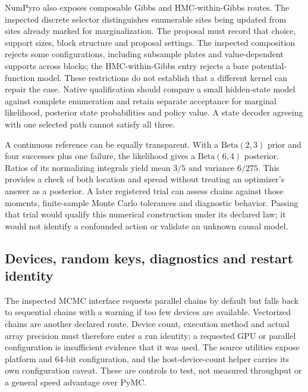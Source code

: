 NumPyro also exposes composable Gibbs and HMC-within-Gibbs routes. The inspected discrete selector distinguishes enumerable sites being updated from sites already marked for marginalization. The proposal must record that choice, support sizes, block structure and proposal settings. The inspected composition rejects some configurations, including subsample plates and value-dependent supports across blocks; the HMC-within-Gibbs entry rejects a bare potential-function model. These restrictions do not establish that a different kernel can repair the case. Native qualification should compare a small hidden-state model against complete enumeration and retain separate acceptance for marginal likelihood, posterior state probabilities and policy value. A state decoder agreeing with one selected path cannot satisfy all three. \cite{exec23_numpyro_sources}

A continuous reference can be equally transparent. With a $\mathrm{Beta}(2,3)$ prior and four successes plus one failure, the likelihood gives a $\mathrm{Beta}(6,4)$ posterior. Ratios of its normalizing integrals yield mean $3/5$ and variance $6/275$. This provides a check of both location and spread without treating an optimizer's answer as a posterior. A later registered trial can assess chains against those moments, finite-sample Monte Carlo tolerances and diagnostic behavior. Passing that trial would qualify this numerical construction under its declared law; it would not identify a confounded action or validate an unknown causal model. \cite{exec23_numpyro_reference}

\subsection{Devices, random keys, diagnostics and restart identity}

The inspected MCMC interface requests parallel chains by default but falls back to sequential chains with a warning if too few devices are available. Vectorized chains are another declared route. Device count, execution method and actual array precision must therefore enter a run identity; a requested GPU or parallel configuration is insufficient evidence that it was used. The source utilities expose platform and 64-bit configuration, and the host-device-count helper carries its own configuration caveat. These are controls to test, not measured throughput or a general speed advantage over PyMC. \cite{exec23_numpyro_sources}

